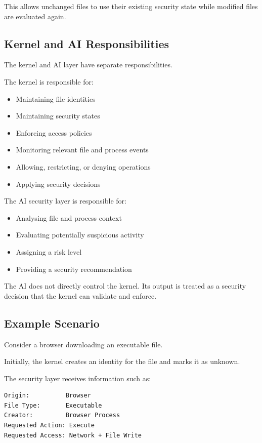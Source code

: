 This allows unchanged files to use their existing security state while modified files are evaluated again.

\subsection{Kernel and AI Responsibilities}

The kernel and AI layer have separate responsibilities.

The kernel is responsible for:

\begin{itemize}
    \item Maintaining file identities
    \item Maintaining security states
    \item Enforcing access policies
    \item Monitoring relevant file and process events
    \item Allowing, restricting, or denying operations
    \item Applying security decisions
\end{itemize}

The AI security layer is responsible for:

\begin{itemize}
    \item Analysing file and process context
    \item Evaluating potentially suspicious activity
    \item Assigning a risk level
    \item Providing a security recommendation
\end{itemize}

The AI does not directly control the kernel. Its output is treated as a security decision that the kernel can validate and enforce.

\subsection{Example Scenario}

Consider a browser downloading an executable file.

Initially, the kernel creates an identity for the file and marks it as unknown.

The security layer receives information such as:

\begin{verbatim}
Origin:          Browser
File Type:       Executable
Creator:         Browser Process
Requested Action: Execute
Requested Access: Network + File Write
\end{verbatim}

